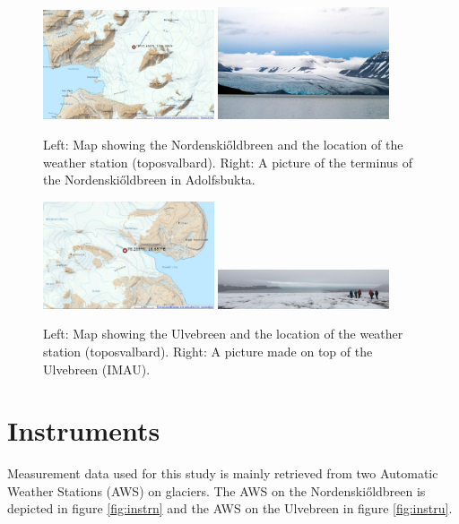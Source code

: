 \documentclass[11pt]{report}
\begin{document}
\begin{figure}[h]
\includegraphics[scale=1, width=0.45\textwidth]{nskimap.jpg}
\includegraphics[scale=1, width=0.45\textwidth]{view1.jpg}
\centering{}
\caption{Left: Map \cite{NPI} showing the Nordenski\H{o}ldbreen and the location of the weather station (toposvalbard). Right: A picture of the terminus of the Nordenski\H{o}ldbreen in Adolfsbukta.}
\label{fig:norden}
\end{figure}

\begin{figure}[h]
\includegraphics[scale=1, width=0.45\textwidth]{ulvemap.jpg}
\includegraphics[scale=1, width=0.45\textwidth]{view2.jpg}
\centering{}
\caption{Left: Map \cite{NPI} showing the Ulvebreen and the location of the weather station (toposvalbard). Right: A picture made on top of the Ulvebreen (IMAU).}
\label{fig:ulve}
\end{figure}

\newpage
\section{Instruments}\label{sec:instr}
Measurement data used for this study is mainly retrieved from two Automatic Weather Stations (AWS) on glaciers. The AWS on the Nordenski\H{o}ldbreen is depicted in figure \ref{fig:instrn} and the AWS on the Ulvebreen in figure \ref{fig:instru}.
\end{document}
